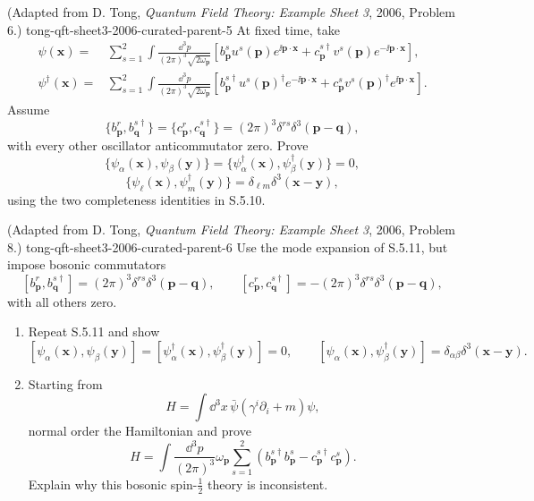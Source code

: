 \begin{enumerate}
  {(Adapted from D. Tong, \emph{Quantum Field Theory: Example Sheet 3}, 2006, Problem 6.)}
  {tong-qft-sheet3-2006-curated-parent-5}
At fixed time, take
\[
\begin{split}
\psi(\mathbf x)
={}&\sum_{s=1}^2\int\frac{\dd^3p}{(2\pi)^3\sqrt{2\omega_{\mathbf p}}}
\left[
b^s_{\mathbf p}u^s(\mathbf p)e^{\ii\mathbf p\cdot\mathbf x}
+c_{\mathbf p}^{s\dagger}v^s(\mathbf p)e^{-\ii\mathbf p\cdot\mathbf x}
\right],\\
\psi^\dagger(\mathbf x)
={}&\sum_{s=1}^2\int\frac{\dd^3p}{(2\pi)^3\sqrt{2\omega_{\mathbf p}}}
\left[
b_{\mathbf p}^{s\dagger}u^s(\mathbf p)^\dagger
 e^{-\ii\mathbf p\cdot\mathbf x}
+c^s_{\mathbf p}v^s(\mathbf p)^\dagger
 e^{\ii\mathbf p\cdot\mathbf x}
\right].
\end{split}
\]
Assume
\[
\{b^r_{\mathbf p},b_{\mathbf q}^{s\dagger}\}
=\{c^r_{\mathbf p},c_{\mathbf q}^{s\dagger}\}
=(2\pi)^3\delta^{rs}\delta^3(\mathbf p-\mathbf q),
\]
with every other oscillator anticommutator zero.  Prove
\[
\{\psi_\alpha(\mathbf x),\psi_\beta(\mathbf y)\}
=\{\psi_\alpha^\dagger(\mathbf x),
\psi_\beta^\dagger(\mathbf y)\}=0,
\]
\[
 \{\psi_\ell(\mathbf x),\psi_m^\dagger(\mathbf y)\}
 =\delta_{\ell m}\delta^3(\mathbf x-\mathbf y),
\]
using the two completeness identities in S.5.10.

  {(Adapted from D. Tong, \emph{Quantum Field Theory: Example Sheet 3}, 2006, Problem 8.)}
  {tong-qft-sheet3-2006-curated-parent-6}
Use the mode expansion of S.5.11, but impose bosonic commutators
\[
[b^r_{\mathbf p},b_{\mathbf q}^{s\dagger}]
=(2\pi)^3\delta^{rs}\delta^3(\mathbf p-\mathbf q),
\qquad
[c^r_{\mathbf p},c_{\mathbf q}^{s\dagger}]
=-(2\pi)^3\delta^{rs}\delta^3(\mathbf p-\mathbf q),
\]
with all others zero.
\begin{enumerate}
\item
Repeat S.5.11 and show
\[
[\psi_\alpha(\mathbf x),\psi_\beta(\mathbf y)]
=[\psi_\alpha^\dagger(\mathbf x),
\psi_\beta^\dagger(\mathbf y)]=0,
\qquad
[\psi_\alpha(\mathbf x),\psi_\beta^\dagger(\mathbf y)]
=\delta_{\alpha\beta}\delta^3(\mathbf x-\mathbf y).
\]
\item
Starting from
\[
 H=\int \dd^3x\,\bar\psi(\gamma^i\partial_i+m)\psi,
\]
normal order the Hamiltonian and prove
\[
 H=\int\frac{\dd^3p}{(2\pi)^3}\omega_{\mathbf p}
 \sum_{s=1}^2
 \left(b_{\mathbf p}^{s\dagger}b_{\mathbf p}^s
 -c_{\mathbf p}^{s\dagger}c_{\mathbf p}^s\right).
\]
Explain why this bosonic spin-\(\tfrac12\) theory is inconsistent.
\end{enumerate}


\end{enumerate}
